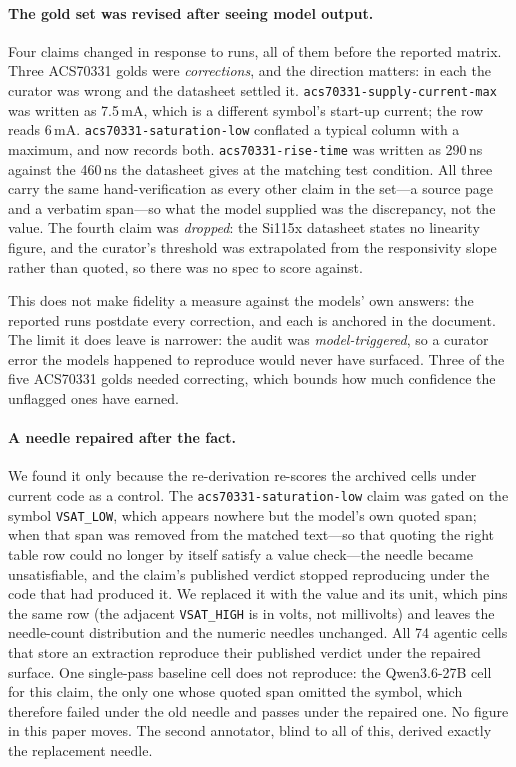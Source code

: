 \documentclass[11pt]{article}
\begin{document}
\paragraph{The gold set was revised after seeing model output.}
Four claims changed in response to runs, all of them before the reported
matrix. Three ACS70331 golds were \emph{corrections}, and the direction
matters: in each the curator was wrong and the datasheet settled it.
\texttt{acs70331-supply-current-max} was written as 7.5\,mA, which is a
different symbol's start-up current; the row reads 6\,mA.
\texttt{acs70331-saturation-low} conflated a typical column with a
maximum, and now records both. \texttt{acs70331-rise-time} was written
as 290\,ns against the 460\,ns the datasheet gives at the matching test
condition. All three carry the same hand-verification as every other
claim in the set---a source page and a verbatim span---so what the model
supplied was the discrepancy, not the value. The fourth claim was
\emph{dropped}: the Si115x datasheet states no linearity figure, and the
curator's threshold was extrapolated from the responsivity slope rather
than quoted, so there was no spec to score against.

This does not make fidelity a measure against the models' own answers:
the reported runs postdate every correction, and each is anchored in
the document. The limit it does leave is narrower: the audit was
\emph{model-triggered}, so a curator error the models happened to
reproduce would never have surfaced. Three of the five ACS70331 golds
needed correcting, which bounds how much confidence the unflagged ones
have earned.

\paragraph{A needle repaired after the fact.}
We found it only because the re-derivation re-scores the archived cells
under current code as a control. The \texttt{acs70331-saturation-low}
claim was gated on the symbol \texttt{VSAT\_LOW}, which appears nowhere
but the model's own quoted span; when that span was removed from the
matched text---so that quoting the right table row could no longer by
itself satisfy a value check---the needle became unsatisfiable, and the
claim's published verdict stopped reproducing under the code that had
produced it. We replaced it with the value and its unit, which pins the
same row (the adjacent \texttt{VSAT\_HIGH} is in volts, not
millivolts) and leaves the needle-count distribution and the numeric
needles unchanged. All 74
agentic cells that store an extraction reproduce their published verdict
under the repaired surface. One single-pass baseline cell does not
reproduce: the Qwen3.6-27B cell for this claim, the only one whose
quoted span omitted the symbol,
which therefore failed under the old needle and passes under the
repaired one. No figure in this paper moves.
The second annotator, blind to all of this, derived exactly the
replacement needle.
\end{document}

